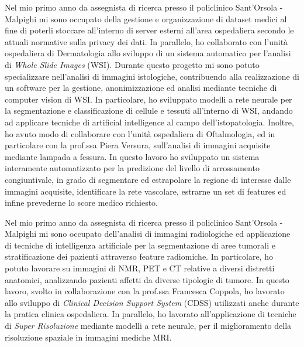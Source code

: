 \documentclass[a4paper,11pt]{article}
\begin{document}
Nel mio primo anno da assegnista di ricerca presso il policlinico Sant'Orsola - Malpighi mi sono occupato della gestione e organizzazione di dataset medici al fine di poterli stoccare all'interno di server esterni all'area ospedaliera secondo le attuali normative sulla privacy dei dati.
In parallelo, ho collaborato con l'unità ospedaliera di Dermatologia allo sviluppo di un sistema automatico per l'analisi di \emph{Whole Slide Images} (WSI).
Durante questo progetto mi sono potuto specializzare nell'analisi di immagini istologiche, contribuendo alla realizzazione di un software per la gestione, anonimizzazione ed analisi mediante tecniche di computer vision di WSI.
In particolare, ho sviluppato modelli a rete neurale per la segmentazione e classificazione di cellule e tessuti all'interno di WSI, andando ad applicare tecniche di artificial intelligence al campo dell'istopatologia.
Inoltre, ho avuto modo di collaborare con l'unità ospedaliera di Oftalmologia, ed in particolare con la prof.ssa Piera Versura, sull'analisi di immagini acquisite mediante lampada a fessura.
In questo lavoro ho sviluppato un sistema interamente automatizzato per la predizione del livello di arrossamento congiuntivale, in grado di segmentare ed estrapolare la regione di interesse dalle immagini acquisite, identificare la rete vascolare, estrarne un set di features ed infine prevederne lo score medico richiesto.

Nel mio primo anno da assegnista di ricerca presso il policlinico Sant'Orsola - Malpighi mi sono occupato dell'analisi di immagini radiologiche ed applicazione di tecniche di intelligenza artificiale per la segmentazione di aree tumorali e stratificazione dei pazienti attraverso feature radiomiche.
In particolare, ho potuto lavorare su immagini di NMR, PET e CT relative a diversi distretti anatomici, analizzando pazienti affetti da diverse tipologie di tumore.
In questo lavoro, svolto in collaborazione con la prof.ssa Francesca Coppola, ho lavorato allo sviluppo di \emph{Clinical Decision Support System} (CDSS) utilizzati anche durante la pratica clinica ospedaliera.
In parallelo, ho lavorato all'applicazione di tecniche di \emph{Super Risoluzione} mediante modelli a rete neurale, per il miglioramento della risoluzione spaziale in immagini mediche MRI.
\end{document}
